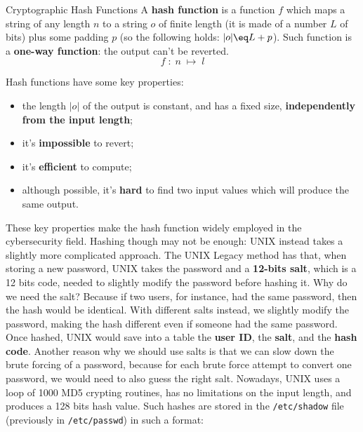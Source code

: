 \begin{definition}{Cryptographic Hash Functions}
    A \textbf{hash function} is a function $f$ which maps a string of any length $n$ to a string $o$ of finite length (it is made of a number $L$ of bits) plus some padding $p$ (so the following holds: $|o| \eq L + p$). Such function is a \textbf{one-way function}: the output can't be reverted.
    \[ f \; : \; n \; \longmapsto \; l \]
\end{definition}

Hash functions have some key properties:
\begin{itemize}
    \item the length $|o|$ of the output is constant, and has a fixed size, \textbf{independently from the input length};
    \item it's \textbf{impossible} to revert;
    \item it's \textbf{efficient} to compute;
    \item although possible, it's \textbf{hard} to find two input values which will produce the same output.
\end{itemize}

These key properties make the hash function widely employed in the cybersecurity field. Hashing though may not be enough: UNIX instead takes a slightly more complicated approach.
\nl
The UNIX Legacy method has that, when storing a new password, UNIX takes the password and a \textbf{12-bits salt}, which is a 12 bits code, needed to slightly modify the password before hashing it. Why do we need the salt? Because if two users, for instance, had the same password, then the hash would be identical. With different salts instead, we slightly modify the password, making the hash different even if someone had the same password. Once hashed, UNIX would save into a table the \textbf{user ID}, the \textbf{salt}, and the \textbf{hash code}.
\nl
Another reason why we should use salts is that we can slow down the brute forcing of a password, because for each brute force attempt to convert one password, we would need to also guess the right salt.
\nl
Nowadays, UNIX uses a loop of 1000 MD5 crypting routines, has no limitations on the input length, and produces a 128 bits hash value. Such hashes are stored in the \verb|/etc/shadow| file (previously in \verb|/etc/passwd|) in such a format:

